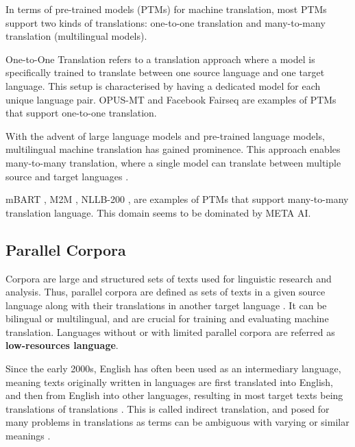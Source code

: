 \documentclass[a4paper]{article}
\begin{document}
In terms of pre-trained models (PTMs) for machine translation, most PTMs support two kinds of translations: one-to-one translation and many-to-many translation (multilingual models).

One-to-One Translation refers to a translation approach where a model is specifically trained to translate between one source language and one target language. This setup is characterised by having a dedicated model for each unique language pair. OPUS-MT \cite{tiedemann-2020-opus-mt} and Facebook Fairseq \cite{ott-2019-fairseq} are examples of PTMs that support one-to-one translation.

With the advent of large language models and pre-trained language models, multilingual machine translation has gained prominence. This approach enables many-to-many translation, where a single model can translate between multiple source and target languages \cite{aharoni-2019-massively-multilingual}.

mBART \cite{liu-2020-mbart}, M2M \cite{fan-2020-m2m100}, NLLB-200 \cite{nllb200-2020}, are examples of PTMs that support many-to-many translation language. This domain seems to be dominated by META AI.


\subsection{Parallel Corpora}

Corpora are large and structured sets of texts used for linguistic research and analysis. Thus, parallel corpora are defined as sets of texts in a given source language along with their translations in another target language \cite{lefer-2020-parallel-corpora}. It can be bilingual or multilingual, and are crucial for training and evaluating machine translation. Languages without or with limited parallel corpora are referred as \textbf{low-resources language}.

Since the early 2000s, English has often been used as an intermediary language, meaning texts originally written in languages are first translated into English, and then from English into other languages, resulting in most target texts being translations of translations \cite{lefer-2020-parallel-corpora}. This is called indirect translation, and posed for many problems in translations as terms can be ambiguous with varying or similar meanings \cite{rosa-2017-indirect-translation-problems}.
\end{document}
